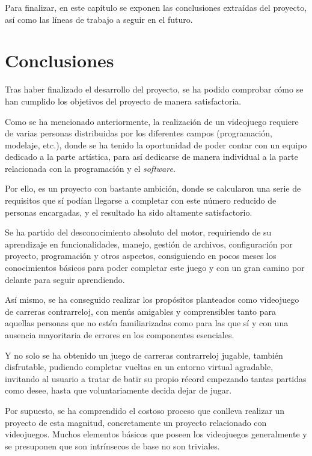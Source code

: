 
Para finalizar, en este capítulo se exponen las conclusiones extraídas del proyecto, así como las líneas de trabajo a seguir en el futuro.

\section{Conclusiones}

Tras haber finalizado el desarrollo del proyecto, se ha podido comprobar cómo se han cumplido los objetivos del proyecto de manera satisfactoria. 

Como se ha mencionado anteriormente, la realización de un videojuego requiere de varias personas distribuidas por los diferentes campos (programación, modelaje, etc.), donde se ha tenido la oportunidad de poder contar con un equipo dedicado a la parte artística, para así dedicarse de manera individual a la parte relacionada con la programación y el \textit{software}. 

Por ello, es un proyecto con bastante ambición, donde se calcularon una serie de requisitos que sí podían llegarse a completar con este número reducido de personas encargadas, y el resultado ha sido altamente satisfactorio.

Se ha partido del desconocimiento absoluto del motor, requiriendo de su aprendizaje en funcionalidades, manejo, gestión de archivos, configuración por proyecto, programación y otros aspectos, consiguiendo en pocos meses los conocimientos básicos para poder completar este juego y con un gran camino por delante para seguir aprendiendo.

Así mismo, se ha conseguido realizar los propósitos planteados como videojuego de carreras contrarreloj, con menús amigables y comprensibles tanto para aquellas personas que no estén familiarizadas como para las que sí y con una ausencia mayoritaria de errores en los componentes esenciales.

Y no solo se ha obtenido un juego de carreras contrarreloj jugable, también disfrutable, pudiendo completar vueltas en un entorno virtual agradable, invitando al usuario a tratar de batir su propio récord empezando tantas partidas como desee, hasta que voluntariamente decida dejar de jugar.

Por supuesto, se ha comprendido el costoso proceso que conlleva realizar un proyecto de esta magnitud, concretamente un proyecto relacionado con videojuegos. Muchos elementos básicos que poseen los videojuegos generalmente y se presuponen que son intrínsecos de base no son triviales.

